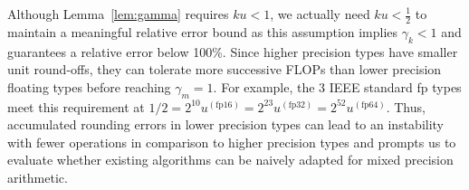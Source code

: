 Although Lemma~\ref{lem:gamma} requires $ku<1$, we actually need $ku <\frac{1}{2}$ to maintain a meaningful relative error bound as this assumption implies $\gamma_k < 1$ and guarantees a relative error below 100\%. 
Since higher precision types have smaller unit round-offs, they can tolerate more successive FLOPs than lower precision floating types before reaching $\gamma_m=1$.
For example, the 3 IEEE standard fp types meet this requirement at $1/2=2^{10}u^{(\text{fp16})}=2^{23}u^{(\text{fp32})}=2^{52}u^{(\text{fp64})}$.
Thus, accumulated rounding errors in lower precision types can lead to an instability with fewer operations in comparison to higher precision types and prompts us to evaluate whether existing algorithms can be naively adapted for mixed precision arithmetic. \par


